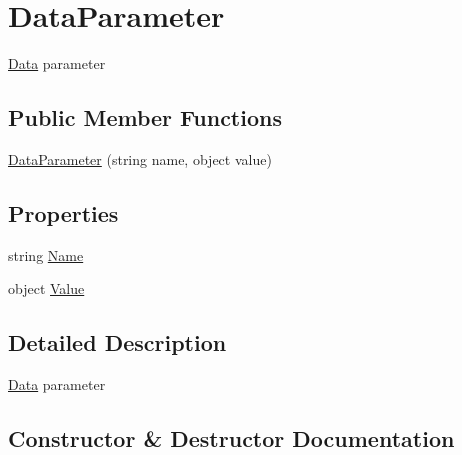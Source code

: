 \hypertarget{structOTA_1_1Data_1_1DataParameter}{}\section{Data\+Parameter}
\label{structOTA_1_1Data_1_1DataParameter}


\hyperlink{namespaceOTA_1_1Data}{Data} parameter  


\subsection*{Public Member Functions}
\begin{DoxyCompactItemize}
\item 
\hyperlink{structOTA_1_1Data_1_1DataParameter_a455197484ca6c08b7f582255ebed9016}{Data\+Parameter} (string name, object value)
\end{DoxyCompactItemize}
\subsection*{Properties}
\begin{DoxyCompactItemize}
\item 
string \hyperlink{structOTA_1_1Data_1_1DataParameter_a7ee9065718e6628dc7791b756fa6c0f9}{Name}
\item 
object \hyperlink{structOTA_1_1Data_1_1DataParameter_a2d7e8cd2081ad3db5aa8e597557123e9}{Value}
\end{DoxyCompactItemize}


\subsection{Detailed Description}
\hyperlink{namespaceOTA_1_1Data}{Data} parameter 



\subsection{Constructor \& Destructor Documentation}
\hypertarget{structOTA_1_1Data_1_1DataParameter_a455197484ca6c08b7f582255ebed9016}{}
